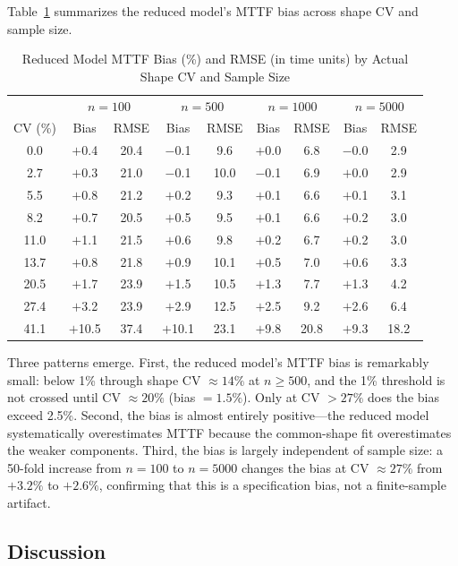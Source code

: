 \documentclass[11pt]{article}
\begin{document}
Table~\ref{tab:consequence} summarizes the reduced model's MTTF bias across shape CV and sample size.

\begin{table}[htbp]
\centering
\caption{Reduced Model MTTF Bias (\%) and RMSE (in time units) by Actual Shape CV and Sample Size}
\label{tab:consequence}
\small
\begin{tabular}{ccccccccc}
\hline
& \multicolumn{2}{c}{$n=100$} & \multicolumn{2}{c}{$n=500$} & \multicolumn{2}{c}{$n=1000$} & \multicolumn{2}{c}{$n=5000$} \\
CV (\%) & Bias & RMSE & Bias & RMSE & Bias & RMSE & Bias & RMSE \\
\hline
0.0 & $+$0.4 & 20.4 & $-$0.1 & 9.6 & $+$0.0 & 6.8 & $-$0.0 & 2.9 \\
2.7 & $+$0.3 & 21.0 & $-$0.1 & 10.0 & $-$0.1 & 6.9 & $+$0.0 & 2.9 \\
5.5 & $+$0.8 & 21.2 & $+$0.2 & 9.3 & $+$0.1 & 6.6 & $+$0.1 & 3.1 \\
8.2 & $+$0.7 & 20.5 & $+$0.5 & 9.5 & $+$0.1 & 6.6 & $+$0.2 & 3.0 \\
11.0 & $+$1.1 & 21.5 & $+$0.6 & 9.8 & $+$0.2 & 6.7 & $+$0.2 & 3.0 \\
13.7 & $+$0.8 & 21.8 & $+$0.9 & 10.1 & $+$0.5 & 7.0 & $+$0.6 & 3.3 \\
20.5 & $+$1.7 & 23.9 & $+$1.5 & 10.5 & $+$1.3 & 7.7 & $+$1.3 & 4.2 \\
27.4 & $+$3.2 & 23.9 & $+$2.9 & 12.5 & $+$2.5 & 9.2 & $+$2.6 & 6.4 \\
41.1 & $+$10.5 & 37.4 & $+$10.1 & 23.1 & $+$9.8 & 20.8 & $+$9.3 & 18.2 \\
\hline
\end{tabular}
\end{table}

Three patterns emerge. First, the reduced model's MTTF bias is remarkably small: below 1\% through shape CV $\approx 14\%$ at $n \geq 500$, and the 1\% threshold is not crossed until CV $\approx 20\%$ (bias $= 1.5\%$). Only at CV $> 27\%$ does the bias exceed 2.5\%. Second, the bias is almost entirely positive---the reduced model systematically overestimates MTTF because the common-shape fit overestimates the weaker components. Third, the bias is largely independent of sample size: a 50-fold increase from $n = 100$ to $n = 5000$ changes the bias at CV $\approx 27\%$ from $+3.2\%$ to $+2.6\%$, confirming that this is a specification bias, not a finite-sample artifact.

\subsection{Discussion}
\end{document}
